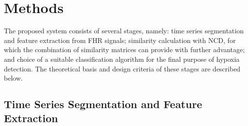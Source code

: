 	\section{Methods} \label{sec:system}


The proposed system consists of several stages, namely: time series segmentation and feature extraction from  FHR signals; similarity calculation with NCD, for which the combination of similarity matrices can provide with further advantage; and choice of a suitable classification algorithm for the final purpose of hypoxia detection. The theoretical basis and design criteria of these stages are described below.



\subsection{Time Series Segmentation and Feature Extraction}  \label{subsec:feat:extraction}

